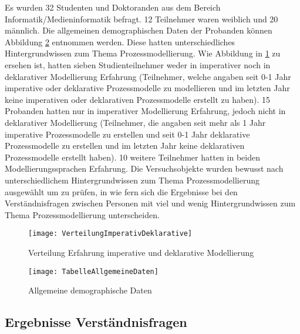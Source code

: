 Es wurden 32 Studenten und Doktoranden aus dem Bereich Informatik/Medieninformatik befragt. 12 Teilnehmer waren weiblich und 20 männlich. Die allgemeinen demographischen Daten der Probanden können Abbildung \ref{fig:TabelleAllgemeineDaten} entnommen werden. Diese hatten unterschiedliches Hintergrundwissen zum Thema Prozessmodellierung. Wie Abbildung in \ref{fig:VerteilungImperativDeklarative} zu ersehen ist, hatten sieben Studienteilnehmer weder in imperativer noch in deklarativer Modellierung Erfahrung (Teilnehmer, welche angaben seit 0-1 Jahr imperative oder deklarative Prozessmodelle zu modellieren und im letzten Jahr keine imperativen oder deklarativen Prozessmodelle erstellt zu haben). 15 Probanden hatten nur in imperativer Modellierung Erfahrung, jedoch nicht in deklarativer Modellierung (Teilnehmer, die angaben seit mehr als 1 Jahr imperative Prozessmodelle zu erstellen und seit 0-1 Jahr deklarative Prozessmodelle zu erstellen und im letzten Jahr keine deklarativen Prozessmodelle erstellt haben). 10 weitere Teilnehmer hatten in beiden Modellierungssprachen Erfahrung. Die Versuchsobjekte wurden bewusst nach unterschiedlichem Hintergrundwissen zum Thema Prozessmodellierung ausgewählt um zu prüfen, in wie fern sich die Ergebnisse bei den Verständnisfragen zwischen Personen mit viel und wenig Hintergrundwissen zum Thema Prozessmodellierung unterscheiden.\newline


\begin{figure}[htp]
\begin{center}
  \texttt{[image: VerteilungImperativDeklarative]} %
  \caption{Verteilung Erfahrung imperative und deklarative Modellierung}
  \label{fig:VerteilungImperativDeklarative}
\end{center}
\end{figure}

\begin{figure}[htp]
\begin{center}
  \texttt{[image: TabelleAllgemeineDaten]} %
  \caption{Allgemeine demographische Daten}
  \label{fig:TabelleAllgemeineDaten}
\end{center}
\end{figure}



\subsection{Ergebnisse Verständnisfragen}

